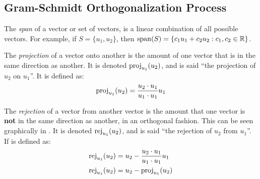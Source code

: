 \subsection{Gram-Schmidt Orthogonalization Process}\label{subsec:Gram-Schmidt_Orthogonalization}
\begin{definition}[Span]\label{def:Span}
  The \emph{span} of a vector or set of vectors, is a linear combination of all possible vectors.
  For example, if $S = \lbrace u_{1}, u_{2} \rbrace$, then $\Span(S) = \lbrace c_{1}u_{1} + c_{2}u_{2} : c_{1}, c_{2} \in \RealNumbers \rbrace$.
\end{definition}

\begin{definition}[Projection]\label{def:Vector_Projection}
  The \emph{projection} of a vector onto another is the amount of one vector that is in the same direction as another.
  It is denoted $\Proj{u_{2}}{u_{1}}$, and is said ``the projection of $u_{2}$ on $u_{1}$''.
  It is defined as:
  \begin{equation}\label{eq:Vector_Projection}
    \Proj{u_{2}}{u_{1}} = \frac{u_{2} \cdot u_{1}}{u_{1} \cdot u_{1}} u_{1}
  \end{equation}
\end{definition}

\begin{definition}[Rejection]\label{def:Vector_Rejection}
  The \emph{rejection} of a vector from another vector is the amount that one vector is \textbf{not} in the same direction as another, in an orthogonal fashion.
  This can be seen graphically in .
  It is denoted $\Rej{u_{2}}{u_{1}}$, and is said ``the rejection of $u_{2}$ from $u_{1}$''.
  If is defined as:
  \begin{equation}\label{eq:Vector_Rejection}
    \begin{aligned}
      \Rej{u_{2}}{u_{1}} &= u_{2} - \frac{u_{2} \cdot u_{1}}{u_{1} \cdot u_{1}} u_{1} \\
      \Rej{u_{2}}{u_{1}} &= u_{2} - \Proj{u_{2}}{u_{1}}
    \end{aligned}
  \end{equation}
\end{definition}


